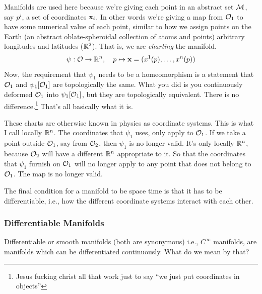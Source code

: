 		Manifolds are used here because we're giving each point in an abstract set $\mathcal M$, say $p^i$, a set of coordinates $\vb{x}_i$. In other words we're giving a map from $\mathcal O_1$ to 
		have some numerical value of each point, similar to how we assign points on the Earth (an abstract oblate-spheroidal collection of atoms and points) arbitrary longitudes and latitudes ($\mathbb{R}^2$).
		That is, we are \textit{charting} the manifold.
		\[
			\psi:\mathcal O \to \mathbb{R}^n,\quad p\mapsto \vb{x} = (x^1(p),\ldots,x^n(p))
		\]
		Now, the requirement that $\psi_1$ needs to be a homeomorphism is a statement that $\mathcal{O}_1$ and $\psi_1[\mathcal{O}_1]$ are 
		topologically the same. What you did is you continuously deformed $\mathcal{O}_1$ into $\psi_1[\mathcal{O}_1]$, but they are topologically equivalent. There is no difference.\footnote{Jesus fucking christ all that work just to say ``we just put coordinates in objects''}
		That's all basically what it is.

		These charts are otherwise known in physics as coordinate systems. This is what I call locally $\mathbb{R}^n$. The coordinates that $\psi_1$ uses, only apply to $\mathcal{O}_1$. If we 
		take a point outside $\mathcal{O}_1$, say from $\mathcal{O}_2$, then $\psi_1$ is no longer valid. It's only locally $\mathbb{R}^n$, because $\mathcal O_2$ will have a different $\mathbb{R}^n$ appropriate
		to it. So that the coordinates that $\psi_1$ furnish on $\mathcal O_1$ will no longer apply to any point
		that does not belong to $\mathcal O_1$. The map is no longer valid.

		The final condition for a manifold to be space time is that it has to be differentiable, i.e., how the different coordinate systems
		interact with each other.

	\subsubsection{Differentiable Manifolds}
		Differentiable or smooth manifolds (both are synonymous) i.e., $C^\infty$ manifolds, are manifolds which can be differentiated
		continuously. What do we mean by that?

